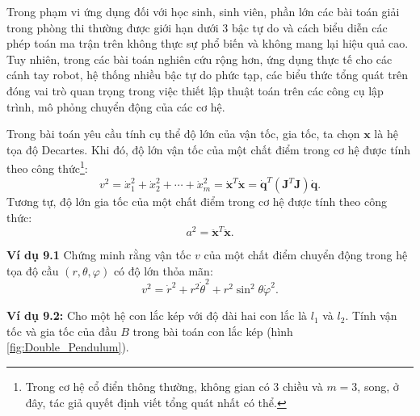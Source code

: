 Trong phạm vi ứng dụng đối với học sinh, sinh viên, phần lớn các bài toán giải trong phòng thi thường được giới hạn dưới 3 bậc tự do và cách biểu diễn các phép toán ma trận trên không thực sự phổ biến và không mang lại hiệu quả cao. Tuy nhiên, trong các bài toán nghiên cứu rộng hơn, ứng dụng thực tế cho các cánh tay robot, hệ thống nhiều bậc tự do phức tạp, các biểu thức tổng quát trên đóng vai trò quan trọng trong việc thiết lập thuật toán trên các công cụ lập trình, mô phỏng chuyển động của các cơ hệ. 

Trong bài toán yêu cầu tính cụ thể độ lớn của vận tốc, gia tốc, ta chọn \(\mathbf{x}\) là hệ tọa độ Decartes. Khi đó, độ lớn vận tốc của một chất điểm trong cơ hệ được tính theo công thức\footnote{Trong cơ hệ cổ điển thông thường, không gian có 3 chiều và \(m=3\), song, ở đây, tác giả quyết định viết tổng quát nhất có thể.}:
\begin{equation}
    v^2 = \dot{x}_1^2 + \dot{x}_2^2 + \cdots +\dot{x}_m^2 = \mathbf{\dot{x}}^T \mathbf{\dot{x}} = \mathbf{\dot{q}}^T \left( \mathbf{J}^T \mathbf{J} \right) \mathbf{\dot{q}}.
\end{equation}
Tương tự, độ lớn gia tốc của một chất điểm trong cơ hệ được tính theo công thức:
\begin{equation}
    a^2 = \mathbf{\ddot{x}}^T \mathbf{\ddot{x}}.
\end{equation}

\textbf{Ví dụ 9.1} Chứng minh rằng vận tốc \(v\) của một chất điểm chuyển động trong hệ tọa độ cầu \(\left( r, \theta, \varphi \right)\) có độ lớn thỏa mãn:
\begin{equation*}
    v^2 = \dot{r}^2 + r^2 \dot{\theta}^2 + r^2 \sin^2 \theta \dot{\varphi}^2.
\end{equation*}

\textbf{Ví dụ 9.2:} Cho một hệ con lắc kép với độ dài hai con lắc là \(l_1\) và \(l_2\). Tính vận tốc và gia tốc của đầu $B$ trong bài toán con lắc kép (hình \ref{fig:Double_Pendulum}).

